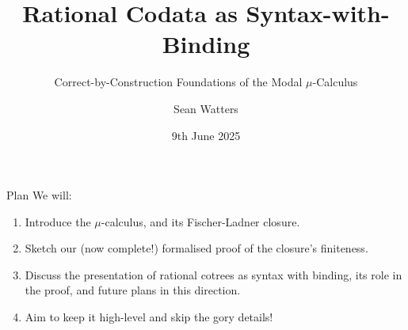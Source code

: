 \documentclass[aspectratio=169]{beamer}
\title[Correct-by-Construction $\mu$-Calculus]{Rational Codata as Syntax-with-Binding}
\subtitle{Correct-by-Construction Foundations of the Modal $\mu$-Calculus}
\author[S. Watters]{Sean Watters}
\institute{University of Strathclyde}
\date{9th June 2025}
\begin{document}
\begin{frame}
  \titlepage{}
\end{frame}

\begin{frame}{Plan}
  We will:
\begin{enumerate}
\item Introduce the $\mu$-calculus, and its Fischer-Ladner closure.
        \smallskip
\item Sketch our (now complete!) formalised proof of the closure's finiteness.
        \smallskip
\item Discuss the presentation of rational cotrees as syntax with binding, its role in the proof, and future plans in this direction.
        \smallskip
\item Aim to keep it high-level and skip the gory details!
\end{enumerate}


\end{frame}






\end{document}

